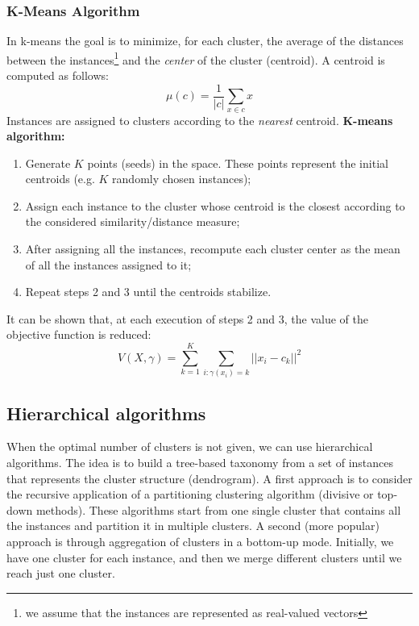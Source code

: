\subsubsection{K-Means Algorithm}
In k-means the goal is to minimize, for each cluster, the average of the distances between the instances\footnote{we assume that the instances are represented as real-valued vectors} and the \textit{center} of the cluster (centroid). A centroid is computed as follows:
\[\mu(c) = \frac{1}{|c|}\sum_{x \in c}x\]
Instances are assigned to clusters according to the \textit{nearest} centroid.\newline\newline
\textbf{K-means algorithm:}
\begin{enumerate}
    \item Generate $K$ points (seeds) in the space. These points represent the initial centroids (e.g. $K$ randomly chosen instances);
    \item Assign each instance to the cluster whose centroid is the closest according to the considered similarity/distance measure;
    \item After assigning all the instances, recompute each cluster center as the mean of all the instances assigned to it;
    \item Repeat steps 2 and 3 until the centroids stabilize.
\end{enumerate}
It can be shown that, at each execution of steps 2 and 3, the value of the objective function is reduced:
\[V(X,\gamma) = \sum_{k=1}^{K}\sum_{i:\gamma (x_{i})=k} ||x_{i} - c_{k}||^{2}\]
\subsection{Hierarchical algorithms}
When the optimal number of clusters is not given, we can use hierarchical algorithms. The idea is to build a tree-based taxonomy from a set of instances that represents the cluster structure (dendrogram).\newline\newline
A first approach is to consider the recursive application of a partitioning clustering algorithm (divisive or top-down methods). These algorithms start from one single cluster that contains all the instances and partition it in multiple clusters.\newline\newline
A second (more popular) approach is through aggregation of clusters in a bottom-up mode. Initially, we have one cluster for each instance, and then we merge different clusters until we reach just one cluster.
